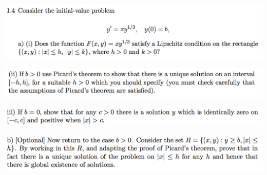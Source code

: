 \documentclass[12pt]{article}
\begin{document}
\begin{mdframed}
\includegraphics[width=400pt]{img/differential-equations-a1-1-4-a.png}
\end{mdframed}
\begin{mdframed}
\includegraphics[width=400pt]{img/differential-equations-a1-1-4-b.png}
\end{mdframed}
\begin{mdframed}
\includegraphics[width=400pt]{img/differential-equations-a1-1-4-c.png}
\end{mdframed}
\begin{mdframed}
\includegraphics[width=400pt]{img/differential-equations-a1-1-4-d.png}
\end{mdframed}
\end{document}
